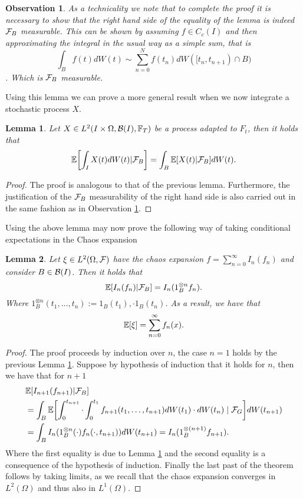 \documentclass[12pt]{article}
\newtheorem{observation}{Observation}
\newtheorem{lemma}{Lemma}
\begin{document}
\begin{observation}\label{obs}
	As a technicality we note that to complete the proof it is necessary to show that the right hand side of the equality of the lemma is indeed $\mathcal{F}_B$ measurable. This can be shown by assuming $f\in C_c(I)$ and then approximating the integral in the usual way as  a simple sum, that is
	$$\int_{B} f(t) dW(t)\sim \sum_{n=0}^{N}f(t_n)dW([t_{n},t_{n+1})\cap B)$$.
	Which is $\mathcal{F}_B$ measurable.
\end{observation}
Using this lemma we can prove a more general result when we now integrate a stochastic process  $X$.
\begin{lemma}\label{cond exp process}
	Let $X\in L^2(I\times\Omega,\mathcal{B}(I),\mathbb{F}_T)$ be a process adapted to $F_t$, then it holds that
	\begin{equation*}
		\mathbb{E}\qty[\int_{I}X(t)dW(t)|\mathcal{F}_B]=\int_{B} \mathbb{E}[X(t)|\mathcal{F}_B] dW(t).
	\end{equation*}
\end{lemma}
\begin{proof}
	The proof is analogous to that of the previous lemma. Furthermore, the justification of the $\mathcal{F}_B$ measurability of the right hand side is also carried out in the same fashion as in Observation \ref{obs}.
\end{proof}
Using the above lemma    may now prove the following way of taking conditional expectations in the Chaos expansion
\begin{lemma}
	Let $\xi \in L^2(\Omega,\mathcal{F})$ have the chaos expansion $f=\sum_{n=0}^{\infty} I_n(f_n)$ and consider $B\in \mathcal{B}(I)$. Then it holds that
	\begin{equation*}
		\mathbb{E}[I_n(f_n)|\mathcal{F}_B]=I_n(1_B^{\otimes n}f_n).
	\end{equation*}
	Where $1_B^{\otimes n}(t_1,\ldots,t_n):=1_B(t_1),\cdot 1_B(t_n)$. As a result, we have that
	\begin{equation*}
		\mathbb{E}[\xi ]=\sum_{n=0}^{\infty}  f_n(x).
	\end{equation*}
\end{lemma}
\begin{proof}
	The proof proceeds by induction over $n$, the case $n=1$ holds by the previous Lemma \ref{cond exp process}. Suppose by hypothesis of induction that it holds for $n$, then we have that for  $n+1$
	\begin{align*}
		 & \mathbb{E}[I_{n+1}(f_{n+1})|\mathcal{F}_B]                                                                                                   \\
		 & =\int_{B}\mathbb{E}\qty[\int_{0}^{t_{n+1}}\cdot \int_{0}^{t_1} f_{n+1}(t_1,\ldots,t_{n+1})dW(t_1)\cdot  dW(t_n)\mid\mathcal{F}_G]dW(t_{n+1}) \\
		 & =\int_{B} I_n(1_B^{\otimes n}(\cdot )f_n(\cdot ,t_{n+1}))dW(t_{n+1})=I_n(1_B^{\otimes (n+1)}f_{n+1}).
	\end{align*}
	Where the first equality is due to Lemma \ref{cond exp process} and the second equality is a consequence of the hypothesis of induction. Finally the last past of the theorem follows by taking limits, as we recall that the chaos expansion converges in $L^2(\Omega)$ and thus also in $L^1(\Omega)$.
\end{proof}
\end{document}
